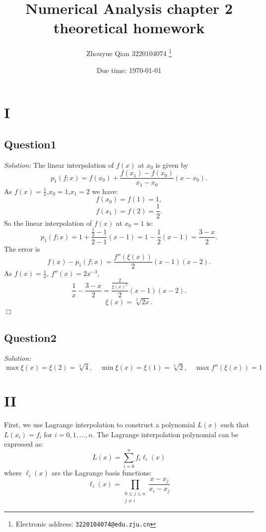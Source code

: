 \documentclass[a4paper]{article}
\begin{document}
\title{Numerical Analysis chapter 2 theoretical homework}

\author{Zhouyue Qian 3220104074
  \thanks{Electronic address: \texttt{3220104074@edu.zju.cn}}}


\date{Due time: \today}

\maketitle






\section*{I}
\subsection*{Question1}
\textit{Solution:}
The linear interpolation of $f(x)$ at $x_0$ is given by $$ p_1(f; x) = f(x_0) + \frac{f(x_1) - f(x_0)}{x_1 - x_0} (x - x_0). $$
As $f(x) = \frac{1}{x}$,$x_0 = 1$,$x_1 = 2$ we have:
$$f(x_0) = f(1) = 1,$$
$$f(x_1) = f(2) = \frac{1}{2}. $$
So the linear interpolation of $f(x)$ at $x_0 = 1$ is:
$$p_1(f; x) = 1 + \frac{\frac{1}{2} - 1}{2 - 1} (x - 1) = 1 - \frac{1}{2}(x - 1) = \frac{3 - x}{2}.$$
The error is   \[f(x) - p_1(f; x) = \frac{f''(\xi(x))}{2} (x - 1)(x - 2).\]
As $f(x) = \frac{1}{x}$, $f''(x) = 2x^{-3}$, \[ \frac{1}{x} - \frac{3 - x}{2} = \frac{\frac{2}{\xi(x)^3}}{2} (x - 1)(x - 2). \]
\[ \xi(x)=\sqrt[3]{2x } . \]\hfill $\Box$ \cite*{deepseek}

\subsection*{Question2}
\textit{Solution:}
$$\max \xi(x) = \xi(2) = \sqrt[3]{4} , \quad \min \xi(x) = \xi(1) = \sqrt[3]{2}, \quad \max f''( \xi(x) ) = 1$$

\section*{II}
First, we use Lagrange interpolation to construct a polynomial \( L(x) \) such that \( L(x_i) = f_i \) for \( i = 0, 1, \ldots, n \). The Lagrange interpolation polynomial can be expressed as:
\[
L(x) = \sum_{i=0}^n f_i \ell_i(x)
\]
where \(\ell_i(x)\) are the Lagrange basis functions:
\[
\ell_i(x) = \prod_{\substack{0 \leq j \leq n \\ j \neq i}} \frac{x - x_j}{x_i - x_j}
\]
\end{document}

